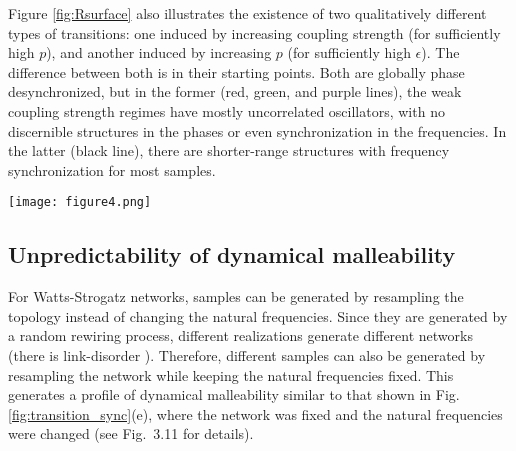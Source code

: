 Figure \ref{fig:Rsurface} also illustrates the existence of two qualitatively different types of transitions: one induced by increasing coupling strength (for sufficiently high $p$), and another induced by increasing $p$ (for sufficiently high $\epsilon$). The difference between both is in their starting points. Both are globally phase desynchronized, but in the former (red, green, and purple lines), the weak coupling strength regimes have mostly uncorrelated oscillators, with no discernible structures in the phases or even synchronization in the frequencies. In the latter (black line), there are shorter-range structures with frequency synchronization for most samples.
%
\begin{figure*}[htb!]
    \centering
    \texttt{[image: figure4.png]}
    \caption{\textbf{Dynamical malleability increases around the regions of transition to phase synchronization.} The surface on the left shows the average degree of phase synchronization $\overline{R}$ across the ensemble ($1000$ realizations of shuffled natural frequencies). The region of high phase synchronization is clearly seen for sufficiently high coupling strength $\epsilon$ and rewiring probability $p$. The colored lines correspond to the parameter values shown in Fig. \ref{fig:transition_sync}. The right panel displays $\Delta$, the difference between the most and least synchronized realizations for each pair $(p, \epsilon$), and we see that the fluctuations from sample to sample increase during the transitions to phase synchronization. The green and purple curves remain close to the region of transition for all $\epsilon \gtrapprox 1$, such that their fluctuations do not decrease with an increase in $\epsilon$. The figure uses Gouraud interpolation to ease visualization by smoothing the curves with a linear interpolation.}
    \label{fig:Rsurface}
\end{figure*}

\subsection{Unpredictability of dynamical malleability}
For Watts-Strogatz networks, samples can be generated by resampling the topology instead of changing the natural frequencies. Since they are generated by a random rewiring process, different realizations generate different networks (there is link-disorder \cite{hong2013link}). Therefore, different samples can also be generated by resampling the network while keeping the natural frequencies fixed. This generates a profile of dynamical malleability similar to that shown in Fig. \ref{fig:transition_sync}(e), where the network was fixed and the natural frequencies were changed (see Fig.~3.11 for details). 

